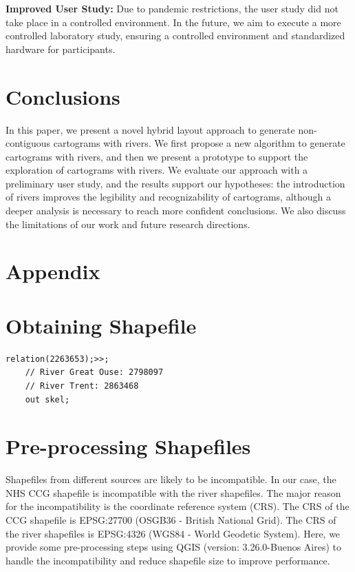 \documentclass[Afour,sagev,times]{sagej}
\begin{document}
\noindent\textbf{Improved User Study:} Due to pandemic restrictions, the user study did not take place in a controlled environment.
In the future, we aim to execute a more controlled laboratory study, ensuring a controlled environment and standardized hardware for participants.


\section{Conclusions}\label{sec:{Conclusions}}

In this paper, we present a novel hybrid layout approach to generate non-contiguous cartograms with rivers.
We first propose a new algorithm to generate cartograms with rivers, and then we present a prototype to support the exploration of cartograms with rivers.
We evaluate our approach with a preliminary user study, and the results support our hypotheses: the introduction of rivers improves the legibility and recognizability of cartograms, although a deeper analysis is necessary to reach more confident conclusions.
We also discuss the limitations of our work and future research directions.




\cleardoublepage

\section{Appendix}
\appendix

\section{Obtaining Shapefile}
\label{obtaining-shapefile}
\begin{lstlisting}[caption={The query that downloads the shapefile of River Thames from OpenStreetMap via the Overpass Turbo API.}, label={overpass},captionpos=b]
    relation(2263653);>>;
    // River Great Ouse: 2798097
    // River Trent: 2863468
    out skel;
\end{lstlisting}
\section{Pre-processing Shapefiles}
\label{app:pre-processing}
Shapefiles from different sources are likely to be incompatible.
In our case, the NHS CCG shapefile is incompatible with the river shapefiles.
The major reason for the incompatibility is the coordinate reference system (CRS).
The CRS of the CCG shapefile is EPSG:27700 (OSGB36 - British National Grid).
The CRS of the river shapefiles is EPSG:4326 (WGS84 - World Geodetic System).
Here, we provide some pre-processing steps using QGIS (version: 3.26.0-Buenos Aires) \cite{qgisWelcome} to handle the incompatibility and reduce shapefile size to improve performance.
\end{document}

